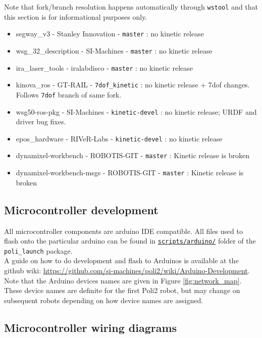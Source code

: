 Note that fork/branch resolution happens automatically through \texttt{wstool} and that this section is for informational purposes only.

\begin{itemize}
   \item segway\_v3 - Stanley Innovation - \texttt{master} : no kinetic release
   \item wsg\_32\_description - SI-Machines - \texttt{master} : no kinetic release
   \item ira\_laser\_tools - iralabdisco - \texttt{master} : no kinetic release
   \item kinova\_ros - GT-RAIL - \texttt{7dof\_kinetic} : no kinetic release + 7dof changes. Follows \texttt{7dof} branch of same fork.
   \item wsg50-ros-pkg - SI-Machines - \texttt{kinetic-devel} : no kinetic release; URDF and driver bug fixes.
   \item epos\_hardware - RIVeR-Labs - \texttt{kinetic-devel} : no kinetic release
   \item dynamixel-workbench - ROBOTIS-GIT - \texttt{master} : Kinetic release is broken
   \item dynamixel-workbench-msgs - ROBOTIS-GIT - \texttt{master} : Kinetic release is broken
\end{itemize}

\subsection{Microcontroller development}
All microcontroller components are arduino IDE compatible. 
All files used to flash onto the particular arduino can be found in \href{https://github.com/si-machines/poli2/tree/master/poli_launch/scripts/arduino}{\texttt{scripts/arduino/}} folder of the \texttt{poli\_launch} package. \\

A guide on how to do development and flash to Arduinos is available at the github wiki: \href{https://github.com/si-machines/poli2/wiki/Arduino-Development}{https://github.com/si-machines/poli2/wiki/Arduino-Development}. \\

Note that the Arduino devices names are given in Figure \ref{fig:network_map}. These device names are definite for the first Poli2 robot, but may change on subsequent robots depending on how device names are assigned.

\subsection{Microcontroller wiring diagrams}
